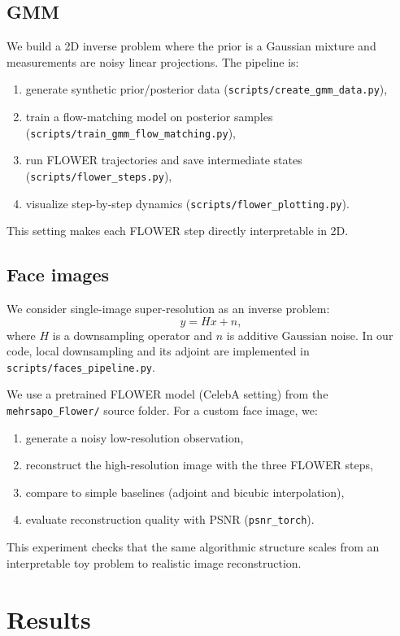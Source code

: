 \documentclass[11pt]{article}
\begin{document}
\subsection{GMM}
\noindent
We build a 2D inverse problem where the prior is a Gaussian mixture and measurements are noisy linear projections.
The pipeline is:
\begin{enumerate}
    \item generate synthetic prior/posterior data (\texttt{scripts/create\_gmm\_data.py}),
    \item train a flow-matching model on posterior samples (\texttt{scripts/train\_gmm\_flow\_matching.py}),
    \item run FLOWER trajectories and save intermediate states (\texttt{scripts/flower\_steps.py}),
    \item visualize step-by-step dynamics (\texttt{scripts/flower\_plotting.py}).
\end{enumerate}
This setting makes each FLOWER step directly interpretable in 2D.

\subsection{Face images}
\noindent
We consider single-image super-resolution as an inverse problem:
\begin{equation}
    y = Hx + n,
\end{equation}
where $H$ is a downsampling operator and $n$ is additive Gaussian noise.
In our code, local downsampling and its adjoint are implemented in \texttt{scripts/faces\_pipeline.py}.

\medskip
\noindent
We use a pretrained FLOWER model (CelebA setting) from the \texttt{mehrsapo\_Flower/} source folder.
For a custom face image, we:
\begin{enumerate}
    \item generate a noisy low-resolution observation,
    \item reconstruct the high-resolution image with the three FLOWER steps,
    \item compare to simple baselines (adjoint and bicubic interpolation),
    \item evaluate reconstruction quality with PSNR (\texttt{psnr\_torch}).
\end{enumerate}
This experiment checks that the same algorithmic structure scales from an interpretable toy problem to realistic image reconstruction.

\section{Results}
\end{document}
